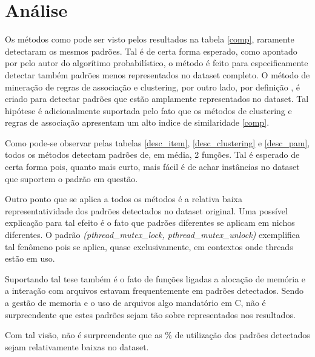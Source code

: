 \section{Análise}

Os métodos como pode ser visto pelos resultados na tabela \ref{comp},
raramente detectaram os mesmos padrões. Tal é de certa forma esperado, como
apontado por pelo autor do algorítimo
probabilístico\cite{probabilistic_api_miner}, o método é feito para
especificamente detectar também padrões menos representados no dataset completo.
O método de mineração de regras de associação e clustering, por outro lado, por
definição \cite{minig_association_rules}, é criado para detectar padrões que
estão amplamente representados no dataset. Tal hipótese é adicionalmente
suportada pelo fato que os métodos de clustering e regras de associação
apresentam um alto indice de similaridade \ref{comp}.

Como pode-se observar pelas tabelas \ref{desc_item}, \ref{desc_clustering} e
\ref{desc_pam}, todos os métodos detectam padrões de, em média, 2 funções. Tal é
esperado de certa forma pois, quanto mais curto, mais fácil é de achar
instâncias no dataset que suportem o padrão em questão.

Outro ponto que se aplica a todos os métodos é a relativa baixa
representatividade dos padrões detectados no dataset original. Uma possível
explicação para tal efeito é o fato que padrões diferentes se aplicam em nichos
diferentes. O padrão \textit{(pthread\_mutex\_lock, pthread\_mutex\_unlock)}
exemplifica tal fenômeno pois se aplica, quase exclusivamente, em contextos onde
threads estão em uso.

Suportando tal tese também é o fato de funções ligadas a alocação de memória e a
interação com arquivos estavam frequentemente em padrões detectados. Sendo a
gestão de memoria e o uso de arquivos algo mandatório em C, não é surpreendente
que estes padrões sejam tão sobre representados nos resultados.

Com tal visão, não é surpreendente que as \% de utilização
dos padrões detectados sejam relativamente baixas no dataset.

